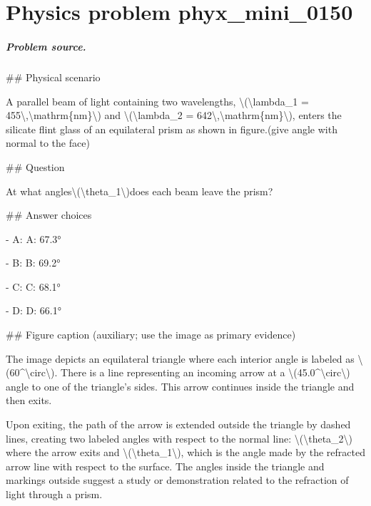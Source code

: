 
\chapter{Physics problem phyx\_mini\_0150}
\label{ch:PhyXMiniProblems_problem_phyx_mini_0150}

\paragraph{Problem source.}
\#\# Physical scenario

A parallel beam of light containing two wavelengths, \textbackslash{}(\textbackslash{}lambda\_1 = 455\textbackslash{},\textbackslash{}mathrm\{nm\}\textbackslash{}) and \textbackslash{}(\textbackslash{}lambda\_2 = 642\textbackslash{},\textbackslash{}mathrm\{nm\}\textbackslash{}), enters the silicate flint glass of an equilateral prism as shown in figure.(give angle with normal to the face)

\#\# Question

At what angles\textbackslash{}(\textbackslash{}theta\_1\textbackslash{})does each beam leave the prism?

\#\# Answer choices

- A: A: 67.3°

- B: B: 69.2°

- C: C: 68.1°

- D: D: 66.1°

\#\# Figure caption (auxiliary; use the image as primary evidence)

The image depicts an equilateral triangle where each interior angle is labeled as \textbackslash{}(60\textasciicircum{}\textbackslash{}circ\textbackslash{}). There is a line representing an incoming arrow at a \textbackslash{}(45.0\textasciicircum{}\textbackslash{}circ\textbackslash{}) angle to one of the triangle's sides. This arrow continues inside the triangle and then exits. 

Upon exiting, the path of the arrow is extended outside the triangle by dashed lines, creating two labeled angles with respect to the normal line: \textbackslash{}(\textbackslash{}theta\_2\textbackslash{}) where the arrow exits and \textbackslash{}(\textbackslash{}theta\_1\textbackslash{}), which is the angle made by the refracted arrow line with respect to the surface. The angles inside the triangle and markings outside suggest a study or demonstration related to the refraction of light through a prism.

